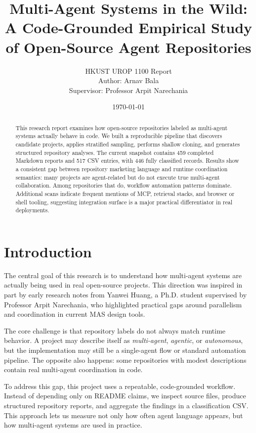 \documentclass[12pt,a4paper,onecolumn]{article}
\title{Multi-Agent Systems in the Wild:\\A Code-Grounded Empirical Study of Open-Source Agent Repositories}
\author{HKUST UROP 1100 Report\\Author: Arnav Bala\\Supervisor: Professor Arpit Narechania}
\date{\today}
\begin{document}
\doublespacing
\maketitle
\begingroup
\setcounter{tocdepth}{2}
\small
\setlength{\parskip}{0pt}
\setlength{\itemsep}{0pt}
\tableofcontents
\endgroup
\newpage

\begin{abstract}
This research report examines how open-source repositories labeled as multi-agent systems actually behave in code. We built a reproducible pipeline that discovers candidate projects, applies stratified sampling, performs shallow cloning, and generates structured repository analyses. The current snapshot contains 459 completed Markdown reports and 517 CSV entries, with 446 fully classified records. Results show a consistent gap between repository marketing language and runtime coordination semantics: many projects are agent-related but do not execute true multi-agent collaboration. Among repositories that do, workflow automation patterns dominate. Additional scans indicate frequent mentions of MCP, retrieval stacks, and browser or shell tooling, suggesting integration surface is a major practical differentiator in real deployments.
\end{abstract}

\section{Introduction}
The central goal of this research is to understand how multi-agent systems are actually being used in real open-source projects.
This direction was inspired in part by early research notes from Yanwei Huang, a Ph.D. student supervised by Professor Arpit Narechania, who highlighted practical gaps around parallelism and coordination in current MAS design tools.

The core challenge is that repository labels do not always match runtime behavior. A project may describe itself as \emph{multi-agent}, \emph{agentic}, or \emph{autonomous}, but the implementation may still be a single-agent flow or standard automation pipeline. The opposite also happens: some repositories with modest descriptions contain real multi-agent coordination in code.

To address this gap, this project uses a repeatable, code-grounded workflow. Instead of depending only on README claims, we inspect source files, produce structured repository reports, and aggregate the findings in a classification CSV. This approach lets us measure not only how often agent language appears, but how multi-agent systems are used in practice.
\end{document}
